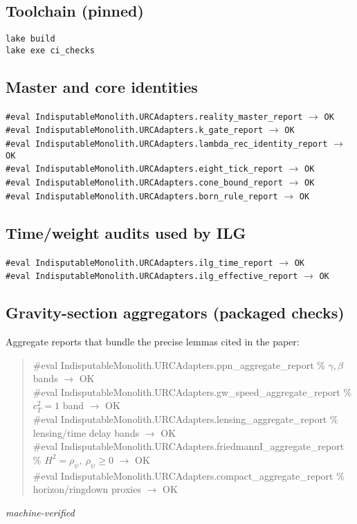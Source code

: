 \documentclass[12pt,a4paper]{article}
\begin{document}
\subsection*{Toolchain (pinned)}
\noindent\texttt{lake build}\\
\noindent\texttt{lake exe ci\_checks}

\subsection*{Master and core identities}
\noindent\texttt{\#eval IndisputableMonolith.URCAdapters.reality\_master\_report} \hfill \(\to\) \texttt{OK}\\
\texttt{\#eval IndisputableMonolith.URCAdapters.k\_gate\_report} \hfill \(\to\) \texttt{OK}\\
\texttt{\#eval IndisputableMonolith.URCAdapters.lambda\_rec\_identity\_report} \hfill \(\to\) \texttt{OK}\\
\texttt{\#eval IndisputableMonolith.URCAdapters.eight\_tick\_report} \hfill \(\to\) \texttt{OK}\\
\texttt{\#eval IndisputableMonolith.URCAdapters.cone\_bound\_report} \hfill \(\to\) \texttt{OK}\\
\texttt{\#eval IndisputableMonolith.URCAdapters.born\_rule\_report} \hfill \(\to\) \texttt{OK}

\subsection*{Time/weight audits used by ILG}
\noindent\texttt{\#eval IndisputableMonolith.URCAdapters.ilg\_time\_report} \hfill \(\to\) \texttt{OK}\\
\texttt{\#eval IndisputableMonolith.URCAdapters.ilg\_effective\_report} \hfill \(\to\) \texttt{OK}

\subsection*{Gravity-section aggregators (packaged checks)}
\noindent Aggregate reports that bundle the precise lemmas cited in the paper:
\begin{quote}\small\ttfamily
\#eval IndisputableMonolith.URCAdapters.ppn\_aggregate\_report \quad\% \(\gamma,\beta\) bands \(\to\) OK\\
\#eval IndisputableMonolith.URCAdapters.gw\_speed\_aggregate\_report \quad\% \(c_T^2=1\) band \(\to\) OK\\
\#eval IndisputableMonolith.URCAdapters.lensing\_aggregate\_report \quad\% lensing/time delay bands \(\to\) OK\\
\#eval IndisputableMonolith.URCAdapters.friedmannI\_aggregate\_report \quad\% \(H^2=\rho_\psi,\ \rho_\psi\ge 0\) \(\to\) OK\\
\#eval IndisputableMonolith.URCAdapters.compact\_aggregate\_report \quad\% horizon/ringdown proxies \(\to\) OK
\end{quote}
\noindent\emph{machine-verified}
\end{document}
